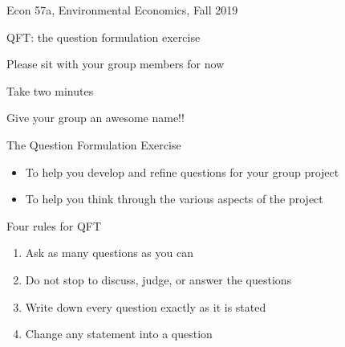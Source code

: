 \begin{frame}{Econ 57a, Environmental Economics, Fall 2019}
\protect\hypertarget{econ-57a-environmental-economics-fall-2019}{}

\begin{block}{QFT: the question formulation exercise}

\end{block}

\end{frame}

\begin{frame}{}
\protect\hypertarget{section}{}

Please sit with your group members for now

\end{frame}

\begin{frame}{Take two minutes}
\protect\hypertarget{take-two-minutes}{}

Give your group an awesome name!!

\end{frame}

\begin{frame}{The Question Formulation Exercise}
\protect\hypertarget{the-question-formulation-exercise}{}

\begin{itemize}
\tightlist
\item
  To help you develop and refine questions for your group project
\item
  To help you think through the various aspects of the project
\end{itemize}

\end{frame}

\begin{frame}{Four rules for QFT}
\protect\hypertarget{four-rules-for-qft}{}

\begin{enumerate}
\tightlist
\item
  Ask as many questions as you can
\item
  Do not stop to discuss, judge, or answer the questions
\item
  Write down every question exactly as it is stated
\item
  Change any statement into a question
\end{enumerate}

\end{frame}

